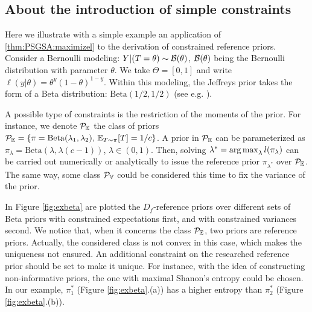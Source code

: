     


\subsection{About the introduction of simple constraints}


Here we illustrate with a simple example an application of \cref{thm:PSGSA:maximizel} to the derivation of constrained reference priors.
Consider a Bernoulli modeling: $Y|(T=\theta)\sim\mathcal{B}(\theta)$, $\mathcal{B}(\theta)$ being the Bernoulli distribution with parameter $\theta$. We take $\Theta=[0,1]$ and write $\ell(y|\theta)=\theta^{y}(1-\theta)^{1-y}$.
%
Within this modeling, the Jeffreys prior takes the form of a Beta distribution: $\mathrm{Beta}(1/2,1/2)$ (see e.g. \cite{robert_bayesian_2007}).


A possible type of constraints is the restriction of the moments of the prior. For instance,
we denote $\mathcal{P}_{\mathbb{E}}$ the class of priors $\mathcal{P}_{\mathbb{E}}=\{\pi=\mathrm{Beta}(\lambda_1,\lambda_2),\,\mathbb{E}_{T\sim\pi}[T]=1/c\}$. A prior in $\mathcal{P}_{\mathbb{E}}$ can be parameterized as $\pi_\lambda = \mathrm{Beta}(\lambda,\lambda(c-1))$, $\lambda\in(0,1)$.
Then, %
solving $\lambda^\ast=\operatorname*{arg\,max}_\lambda l(\pi_\lambda)$ can be carried out numerically or analytically to issue the reference prior $\pi_{\lambda^\ast}$ over $\mathcal{P}_{\mathbb{E}}$.
The same way, some class $\mathcal{P}_{\mathbb{V}}$ could be considered this time to fix the variance of the prior.

In Figure \ref{fig:exbeta} are plotted the $D_f$-reference priors over different sets of Beta priors with constrained expectations first, and with constrained variances second. We notice that, when it concerns the class $\mathcal{P}_{\mathbb{E}}$, two priors are reference priors. Actually, the considered class is not convex in this case, which makes the uniqueness not ensured. An additional constraint on the researched reference prior should be set to make it unique. For instance, with the idea of constructing non-informative priors, the one with maximal Shanon's entropy could be chosen. In our example, $\pi_1^\ast$ (Figure \ref{fig:exbeta}.(a)) has a higher entropy than $\pi_2^\ast$ (Figure \ref{fig:exbeta}.(b)).



